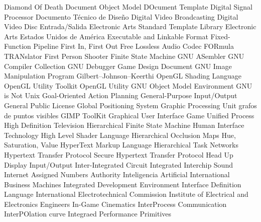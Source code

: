 {\begin{acronym}[XXXXXXXX]
    {Diamond Of Death}
    {Document Object Model}
    {DOcument Template}
    {Digital Signal Processor}
    {Documento Técnico de Diseño}
    {Digital Video Broadcasting}
    {Digital Video Disc}
    {Entrada/Salida}
  {Electronic Arts Standard Template Library}
     {Electronic Arts}
   {Estados Unidos de América}
    {Executable and Linkable Format}
    {Fixed-Function Pipeline}
   {First In, First Out}
   {Free Lossless Audio Codec}
 {FORmula TRANslator}
    {First Person Shooter}
    {Finite State Machine}
    {\acs{GNU} ASembler}
    {\acs{GNU} Compiler Collection}
    {\acs{GNU} Debugger}
    {Game Design Document}
   {\acs{GNU} Image Manipulation Program}
    {Gilbert–Johnson–Keerthi}
   {OpenGL Shading Language}
   {OpenGL Utility Toolkit}
    {OpenGL Utility}
  {\acs{GNU} Object Model Environment}
    {\acs{GNU} is Not Unix}
   {Goal-Oriented Action Planning}
   {General-Purpose Input/Output}
    {General Public License}
    {Global Positioning System}
    {Graphic Processing Unit}
    {grafos de puntos visibles}
    {\acs{GIMP} ToolKit}
    {Graphical User Interface}
    {Game Unified Process}
   {High Definition Television}
   {Hierarchical Finite State Machine}
    {Human Interface Technology}
   {High Level Shader Language}
    {Hierarchical Occlusion Maps}
    {Hue, Saturation, Value}
   {HyperText Markup Language}
    {Hierarchical Task Networks}
  {Hypertext Transfer Protocol Secure}
   {Hypertext Transfer Protocol}
    {Head Up Display}
    {Input/Output}
    {Inter-Integrated Circuit}
    {Integrated Interchip Sound}
   {Internet Assigned Numbers Authority}
     {Inteligencia Artificial}
    {International Business Machines}
    {Integrated Development Environment}
    {Interface Definition Language}
    {International Electrotechnical Commission}
   {Institute of Electrical and Electronics Engineers}
    {In-Game Cinematics}
    {InterProcess Communication}
    {InterPOlation curve}
    {Integraed Performance Primitives}

\end{acronym}}
